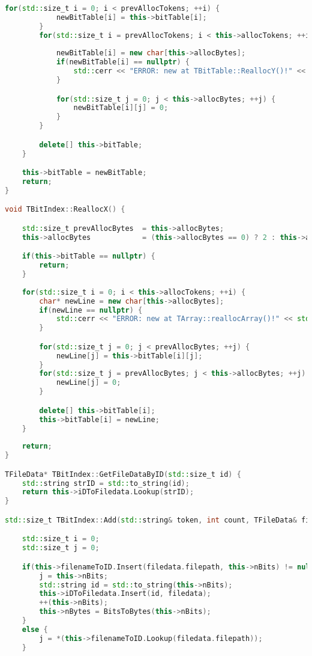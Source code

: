 \begin{lstlisting}[language=C++]
        for(std::size_t i = 0; i < prevAllocTokens; ++i) {
            newBitTable[i] = this->bitTable[i];
        }
        for(std::size_t i = prevAllocTokens; i < this->allocTokens; ++i) {
            
            newBitTable[i] = new char[this->allocBytes];
            if(newBitTable[i] == nullptr) {
                std::cerr << "ERROR: new at TBitTable::ReallocY()!" << std::endl;
            }

            for(std::size_t j = 0; j < this->allocBytes; ++j) {
                newBitTable[i][j] = 0;
            }
        }

        delete[] this->bitTable;
    }

    this->bitTable = newBitTable;
    return;
}

void TBitIndex::ReallocX() {

    std::size_t prevAllocBytes  = this->allocBytes;
    this->allocBytes            = (this->allocBytes == 0) ? 2 : this->allocBytes * 2;

    if(this->bitTable == nullptr) {
        return;
    }
    
    for(std::size_t i = 0; i < this->allocTokens; ++i) {
        char* newLine = new char[this->allocBytes];
        if(newLine == nullptr) {
            std::cerr << "ERROR: new at TArray::reallocArray()!" << std::endl;
        }

        for(std::size_t j = 0; j < prevAllocBytes; ++j) {
            newLine[j] = this->bitTable[i][j];
        }
        for(std::size_t j = prevAllocBytes; j < this->allocBytes; ++j) {
            newLine[j] = 0;
        }

        delete[] this->bitTable[i];
        this->bitTable[i] = newLine;
    }
    
    return;
}

TFileData* TBitIndex::GetFileDataByID(std::size_t id) {
    std::string strID = std::to_string(id);
    return this->iDToFiledata.Lookup(strID);
}

std::size_t TBitIndex::Add(std::string& token, int count, TFileData& filedata) {

    std::size_t i = 0;
    std::size_t j = 0;

    if(this->filenameToID.Insert(filedata.filepath, this->nBits) != nullptr) {
        j = this->nBits;
        std::string id = std::to_string(this->nBits);
        this->iDToFiledata.Insert(id, filedata);
        ++(this->nBits);
        this->nBytes = BitsToBytes(this->nBits);
    }
    else {
        j = *(this->filenameToID.Lookup(filedata.filepath));
    }


\end{lstlisting}
